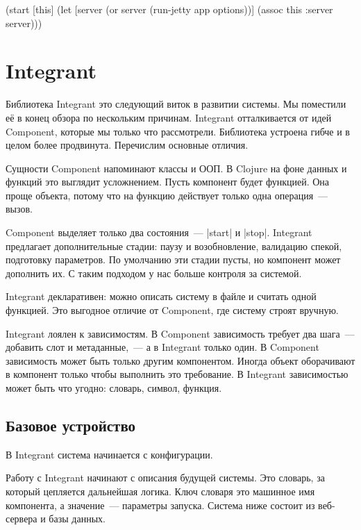 \begin{english}
  \begin{clojure}
(start [this]
  (let [server (or server (run-jetty app options))]
    (assoc this :server server)))
  \end{clojure}
\end{english}

\section{Integrant}

Библиотека Integrant это
следующий виток в развитии системы. Мы поместили е\"{е} в конец обзора по нескольким
причинам. Integrant отталкивается от идей Component, которые мы только что
рассмотрели. Библиотека устроена гибче и в целом более продвинута. Перечислим
основные отличия.

Сущности Component напоминают классы и ООП. В Clojure на фоне данных и функций
это выглядит усложнением. Пусть компонент будет функцией. Она проще объекта,
потому что на функцию действует только одна операция~--- вызов.

Component выделяет только два состояния~--- \spverb|start| и
\spverb|stop|. Integrant предлагает дополнительные стадии: паузу и
возобновление, валидацию спекой, подготовку параметров. По умолчанию эти стадии
пусты, но компонент может дополнить их. С таким подходом у нас больше контроля
за системой.

Integrant декларативен: можно описать систему в файле и считать одной
функцией. Это выгодное отличие от Component, где систему строят вручную.

Integrant лоялен к зависимостям. В Component зависимость требует два шага~---
добавить слот и метаданные,~--- а в Integrant только один. В Component
зависимость может быть только другим компонентом. Иногда объект оборачивают в
компонент только чтобы выполнить это требование. В Integrant зависимостью может
быть что угодно: словарь, символ, функция.

\subsection{Базовое устройство}

В Integrant система начинается с конфигурации.

Работу с Integrant начинают с описания будущей системы. Это словарь, за который
цепляется дальнейшая логика. Ключ словаря это машинное имя компонента, а
значение~--- параметры запуска. Система ниже состоит из веб-сервера и базы
данных.

